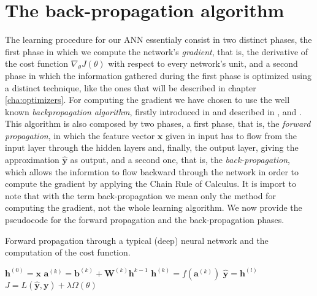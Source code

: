 	\section{The back-propagation algorithm} %
	\label{sec:the_back-propagation_algorithm}
		\noindent
		The learning procedure for our ANN essentialy consist in two distinct phases, the first phase in which we
		compute the network's \textit{gradient}, that is, the derivative of the cost function
		$\nabla_{\theta} J(\theta)$ with respect to every network's unit, and a second phase in which the
		information gathered during the first phase is optimized using a distinct technique, like the ones
		that will be described in chapter \ref{cha:optimizers}. For computing the gradient we have chosen to use
		the well known \textit{backpropagation algorithm}, firstly introduced in \cite{10028086174} and described
		in \cite{Goodfellow-et-al-2016}, \cite{haykin2009neural} and \cite{mitchell1997machine}. This algorithm is
		also composed by two phases, a first phase, that is, the \textit{forward propagation}, in which the
		feature vector $\mathbf{x}$ given in input has to flow from the input layer through the hidden layers and,
		finally, the output layer, giving the approximation $\hat{\mathbf{y}}$ as output, and a second one, that
		is, the \textit{back-propagation}, which allows the informtion to flow backward through the network in
		order to compute the gradient by applying the Chain Rule of Calculus. It is import to note that with the
		term back-propagation we mean only the method for computing the gradient, not the whole learning algorithm.
		We now provide the pseudocode for the forward propagation and the back-propagation phases.

		\begin{algorithm}
			\caption{Forward propagation through a typical (deep) neural network and the computation of the cost
			function.}
			\label{alg:forward_propagation}
			\begin{algorithmic}[1]
					\State $\mathbf{h}^{(0)} = \mathbf{x}$
						\State $\mathbf{a}^{(k)} = \mathbf{b}^{(k)} + \mathbf{W}^{(k)}\mathbf{h}^{k - 1}$
						\State $\mathbf{h}^{(k)} = f(\mathbf{a}^{(k)})$
					\EndFor
					\State $\hat{\mathbf{y}} = \mathbf{h}^{(l)}$
					\State $J = L(\hat{\mathbf{y}}, \mathbf{y}) + \lambda \Omega(\theta)$
				\EndProcedure
			\end{algorithmic}
		\end{algorithm}

